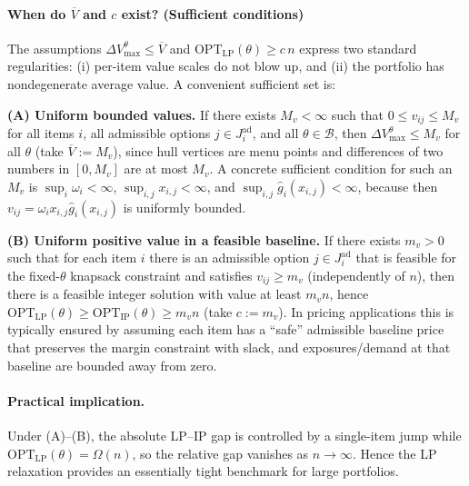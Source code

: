 \documentclass[11pt, a4paper]{article}
\theoremstyle{plain}
\theoremstyle{definition}
\theoremstyle{remark}
\begin{document}
\paragraph{When do \texorpdfstring{$\overline V$}{Vbar} and $c$ exist? (Sufficient conditions)}
The assumptions $\Delta V_{\max}^\theta\le \overline V$ and $\mathrm{OPT}_{\mathrm{LP}}(\theta)\ge c\,n$ express two standard regularities:
(i) per-item value scales do not blow up, and (ii) the portfolio has nondegenerate average value. A convenient sufficient set is:

\medskip
\noindent\textbf{(A) Uniform bounded values.}
If there exists $M_v<\infty$ such that $0\le v_{ij}\le M_v$ for all items $i$, all admissible options $j\in J_i^{\mathrm{ad}}$, and all
$\theta\in\mathcal B$, then $\Delta V_{\max}^\theta\le M_v$ for all $\theta$ (take $\overline V:=M_v$), since hull vertices are menu points
and differences of two numbers in $[0,M_v]$ are at most $M_v$.
A concrete sufficient condition for such an $M_v$ is
$\sup_i\omega_i<\infty$, $\sup_{i,j}x_{i,j}<\infty$, and $\sup_{i,j}\hat g_i(x_{i,j})<\infty$, because then
$v_{ij}=\omega_i x_{i,j}\hat g_i(x_{i,j})$ is uniformly bounded.

\medskip
\noindent\textbf{(B) Uniform positive value in a feasible baseline.}
If there exists $m_v>0$ such that for each item $i$ there is an admissible option $j\in J_i^{\mathrm{ad}}$ that is feasible for the fixed-$\theta$
knapsack constraint and satisfies $v_{ij}\ge m_v$ (independently of $n$), then there is a feasible integer solution with value at least
$m_v n$, hence $\mathrm{OPT}_{\mathrm{LP}}(\theta)\ge \mathrm{OPT}_{\mathrm{IP}}(\theta)\ge m_v n$ (take $c:=m_v$).
In pricing applications this is typically ensured by assuming each item has a ``safe'' admissible baseline price that preserves the margin
constraint with slack, and exposures/demand at that baseline are bounded away from zero.

\paragraph{Practical implication.}
Under (A)--(B), the absolute LP--IP gap is controlled by a single-item jump while $\mathrm{OPT}_{\mathrm{LP}}(\theta)=\Omega(n)$, so the
relative gap vanishes as $n\to\infty$. Hence the LP relaxation provides an essentially tight benchmark for large portfolios.

\end{document}
